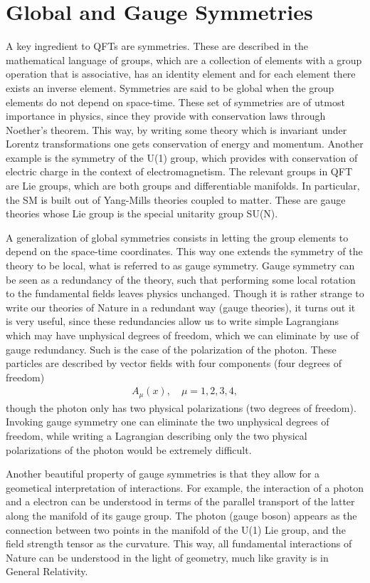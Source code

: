 \section{Global and Gauge Symmetries}

A key ingredient to QFTs are symmetries. These are described in the mathematical language of groups, which are a collection of elements with a group operation that is associative, has an identity element and for each element there exists an inverse element. Symmetries are said to be global when the group elements do not depend on space-time. These set of symmetries are of utmost importance in physics, since they provide with conservation laws through Noether's theorem. This way, by writing some theory which is invariant under Lorentz transformations one gets conservation of energy and momentum. Another example is the symmetry of the U(1) group, which provides with conservation of electric charge in the context of electromagnetism. The relevant groups in QFT are Lie groups, which are both groups and differentiable manifolds. In particular, the SM is built out of Yang-Mills theories coupled to matter. These are gauge theories whose Lie group is the special unitarity group SU(N).

A generalization of global symmetries consists in letting the group elements to depend on the space-time coordinates. This way one extends the symmetry of the theory to be local, what is referred to as gauge symmetry. Gauge symmetry can be seen as a redundancy of the theory, such that performing some local rotation to the fundamental fields leaves physics unchanged. Though it is rather strange to write our theories of Nature in a redundant way (gauge theories), it turns out it is very useful, since these redundancies allow us to write simple Lagrangians which may have unphysical degrees of freedom, which we can eliminate by use of gauge redundancy. Such is the case of the polarization of the photon. These particles are described by vector fields with four components (four degrees of freedom)
\begin{gather}
A_{\mu}(x), \quad \mu=1,2,3,4,
\end{gather}
though the photon only has two physical polarizations (two degrees of freedom). Invoking gauge symmetry one can eliminate the two unphysical degrees of freedom, while writing a Lagrangian describing only the two physical polarizations of the photon would be extremely difficult. 

Another beautiful property of gauge symmetries is that they allow for a geometical interpretation of interactions. For example, the interaction of a photon and a electron can be understood in terms of the parallel transport of the latter along the manifold of its gauge group. The photon (gauge boson) appears as the connection between two points in the manifold of the U(1) Lie group, and the field strength tensor as the curvature. This way, all fundamental interactions of Nature can be understood in the light of geometry, much like gravity is in General Relativity.

